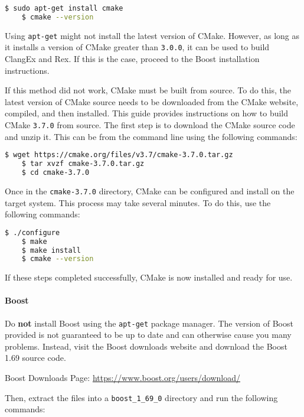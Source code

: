 \begin{lstlisting}[language=bash]
  	$ sudo apt-get install cmake
	$ cmake --version
\end{lstlisting}

\noindent Using \texttt{apt-get} might not install the latest version of CMake.
However, as long as it installs a version of CMake greater than \texttt{3.0.0},
it can be used to build ClangEx and Rex. If this is the case, proceed to the
Boost installation instructions.

If this method did not work, CMake must be built from source. To do this, the
latest version of CMake source needs to be downloaded from the CMake website,
compiled, and then installed. This guide provides instructions on how to build
CMake \texttt{3.7.0} from source. The first step is to download the CMake source
code and unzip it. This can be from the command line using the following
commands:

\begin{lstlisting}[language=bash]
	$ wget https://cmake.org/files/v3.7/cmake-3.7.0.tar.gz
	$ tar xvzf cmake-3.7.0.tar.gz
	$ cd cmake-3.7.0
\end{lstlisting}

\noindent Once in the \texttt{cmake-3.7.0} directory, CMake can be configured
and install on the target system. This process may take several minutes. To do
this, use the following commands:

\begin{lstlisting}[language=bash]
	$ ./configure
	$ make
	$ make install
	$ cmake --version
\end{lstlisting}

\noindent If these steps completed successfully, CMake is now installed and
ready for use.

\paragraph{Boost}

Do \textbf{not} install Boost using the \texttt{apt-get} package manager. The
version of Boost provided is not guaranteed to be up to date and can otherwise
cause you many problems. Instead, visit the Boost downloads website and download
the Boost 1.69 source code.

\bigskip
Boost Downloads Page: \url{https://www.boost.org/users/download/}
\bigskip

\noindent Then, extract the files into a \texttt{boost\_1\_69\_0} directory and
run the following commands:

